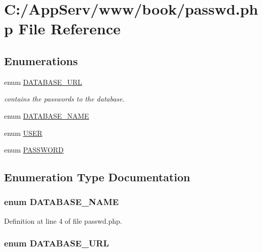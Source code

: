 \hypertarget{passwd_8php}{
\section{C:/AppServ/www/book/passwd.php File Reference}
\label{passwd_8php}
}
\subsection*{Enumerations}
\begin{DoxyCompactItemize}
\item 
enum \hyperlink{passwd_8php_a8b49cbd6aa98de2ea8630e41f2ba2f71}{DATABASE\_\-URL} 
\begin{DoxyCompactList}\small\item\em contains the passwords to the database. \item\end{DoxyCompactList}\item 
enum \hyperlink{passwd_8php_aa1b72844d2293c7f3c44691cf20a4143}{DATABASE\_\-NAME} 
\item 
enum \hyperlink{passwd_8php_ae355ff3a4a5960b855abdbe2666e5e1d}{USER} 
\item 
enum \hyperlink{passwd_8php_a3326d90c69de890a754f0806f94607e2}{PASSWORD} 
\end{DoxyCompactItemize}


\subsection{Enumeration Type Documentation}
\hypertarget{passwd_8php_aa1b72844d2293c7f3c44691cf20a4143}{
\subsubsection[{DATABASE\_\-NAME}]{\setlength{\rightskip}{0pt plus 5cm}enum {\bf DATABASE\_\-NAME}}}
\label{passwd_8php_aa1b72844d2293c7f3c44691cf20a4143}


Definition at line 4 of file passwd.php.

\hypertarget{passwd_8php_a8b49cbd6aa98de2ea8630e41f2ba2f71}{
\subsubsection[{DATABASE\_\-URL}]{\setlength{\rightskip}{0pt plus 5cm}enum {\bf DATABASE\_\-URL}}}
\label{passwd_8php_a8b49cbd6aa98de2ea8630e41f2ba2f71}


